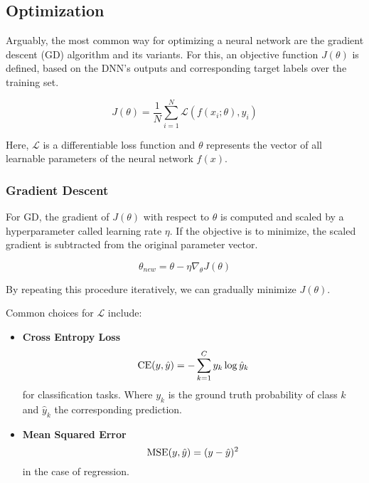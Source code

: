 \subsection{Optimization}
Arguably, the most common way for optimizing a neural network are the gradient descent (GD) algorithm and its variants. For this, an objective function $J(\theta)$ is defined, based on the DNN's outputs and corresponding target labels over the training set.

\begin{equation}
    J(\theta) = \frac{1}{N} \sum_{i=1}^{N} \mathcal{L}(f(x_i; \theta), y_i)
\end{equation}

Here, $\mathcal{L}$ is a differentiable loss function and $\theta$ represents the vector of all learnable parameters of the neural network $f(x)$.

\subsubsection{Gradient Descent}
For GD, the gradient of $J(\theta)$ with respect to $\theta$ is computed and scaled by a hyperparameter called learning rate $\eta$. If the objective is to minimize, the scaled gradient is subtracted from the original parameter vector.

\begin{equation}
    \theta_{new} = \theta - \eta\nabla_\theta J(\theta)
\end{equation}

By repeating this procedure iteratively, we can gradually minimize $J(\theta)$.

Common choices for $\mathcal{L}$ include:
\begin{itemize}
    \item \textbf{Cross Entropy Loss}
          \begin{equation}
            \label{eq:ce_loss}
              \text{CE}(y, \hat{y}) = - \sum_{k=1}^C y_k \log \hat{y}_k
          \end{equation}
          for classification tasks. Where $y_k$ is the ground truth probability of class $k$ and $\hat{y}_k$ the corresponding prediction.

    \item \textbf{Mean Squared Error}
          \begin{equation}
              \text{MSE}(y, \hat{y}) = (y - \hat{y})^2
          \end{equation}
          in the case of regression.
\end{itemize}

